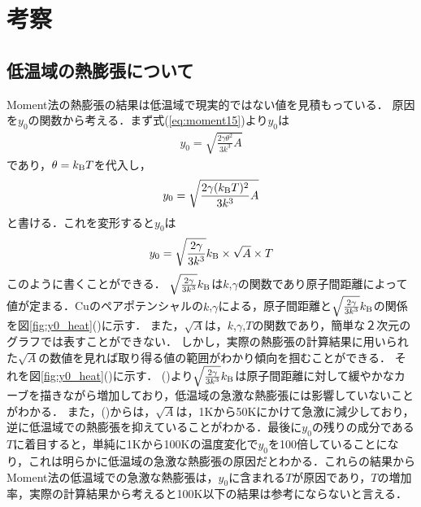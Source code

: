\chapter{考察}
\section{低温域の熱膨張について}
\label{sec:he_100k}
Moment法の熱膨張の結果は低温域で現実的ではない値を見積もっている．
原因を$y_0$の関数から考える．まず式(\ref{eq:moment15})より$y_0$は
\begin{eqnarray}
\label{eq:y01}
y_0= \sqrt{\frac{2\gamma\theta^2}{3k^3}A}
\end{eqnarray}
であり，$\theta=k_{\rm{B}}T$を代入し，
\begin{eqnarray}
\label{eq:y02}
y_0= \sqrt{\frac{2\gamma(k_{\rm{B}}T)^2}{3k^3}A}
\end{eqnarray}
と書ける．これを変形すると$y_0$は
\begin{eqnarray}
\label{eq:y02}
y_0= \sqrt{\frac{2\gamma}{3k^3}}k_{\rm{B}}\times \sqrt{A} \times T
\end{eqnarray}
このように書くことができる．
$\sqrt{\frac{2\gamma}{3k^3}}k_{\rm{B}}$は$k$,$\gamma$の関数であり原子間距離によって値が定まる．Cuのペアポテンシャルの$k$,$\gamma$による，原子間距離と$\sqrt{\frac{2\gamma}{3k^3}}k_{\rm{B}}$の関係を図\ref{fig:y0_heat}()に示す．
また，$\sqrt{A}$は，$k$,$\gamma$,$T$の関数であり，簡単な２次元のグラフでは表すことができない．
しかし，実際の熱膨張の計算結果に用いられた$\sqrt{A}$の数値を見れば取り得る値の範囲がわかり傾向を掴むことができる．
それを図\ref{fig:y0_heat}()に示す．
()より$\sqrt{\frac{2\gamma}{3k^3}}k_{\rm{B}}$は原子間距離に対して緩やかなカーブを描きながら増加しており，低温域の急激な熱膨張には影響していないことがわかる．
また，()からは，$\sqrt{A}$は，1Kから50Kにかけて急激に減少しており，逆に低温域での熱膨張を抑えていることがわかる．最後に$y_0$の残りの成分である$T$に着目すると，単純に1Kから100Kの温度変化で$y_0$を100倍していることになり，これは明らかに低温域の急激な熱膨張の原因だとわかる．これらの結果からMoment法の低温域での急激な熱膨張は，$y_0$に含まれる$T$が原因であり，$T$の増加率，実際の計算結果から考えると100K以下の結果は参考にならないと言える．
